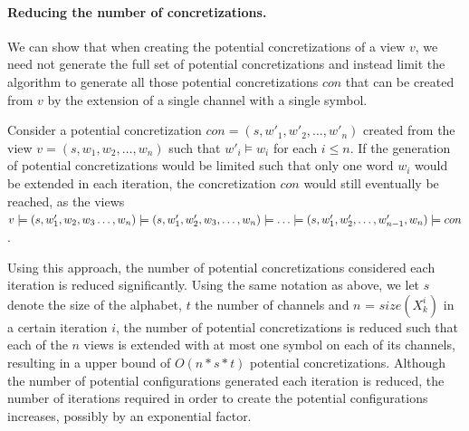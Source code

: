 \paragraph{Reducing the number of concretizations.}
We can show that when creating the potential concretizations of a view $v$, we need not generate the full set of potential concretizations and instead limit the algorithm to generate all those potential concretizations $con$ that can be created from $v$ by the extension of a single channel with a single symbol.

Consider a potential concretization $con = (s, w'_1, w'_2, \ldots, w'_n)$ created from the view $v = (s, w_1, w_2, \ldots, w_n)$ such that $w'_i \models w_i$ for each $i \leq n$. If the generation of potential concretizations would be limited such that only one word $w_i$ would be extended in each iteration, the concretization $con$ would still eventually be reached, as the views $v \models (s, w'_1, w_2, w_3 \ldots, w_n) \models (s, w'_1, w'_2, w_3, \ldots, w_n) \models \ldots \models (s, w'_1, w'_2, \ldots, w'_{n-1}, w_n) \models con$.

Using this approach, the number of potential concretizations considered each iteration is reduced significantly. Using the same notation as above, we let $s$ denote the size of the alphabet, $t$ the number of channels and $n$ = $size(X_k^i)$ in a certain iteration $i$, the number of potential concretizations is reduced such that each of the $n$ views is extended with at most one symbol on each of its channels, resulting in a upper bound of $O(n*s*t)$ potential concretizations. Although the number of potential configurations generated each iteration is reduced, the number of iterations required in order to create the potential configurations increases, possibly by an exponential factor.

